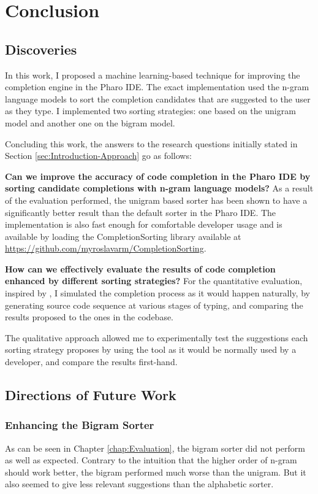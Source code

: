 \chapter{Conclusion}
\label{chap:Conclusion}
\section{Discoveries}
\label{sec:Conclusion-Discoveries}
In this work, I proposed a machine learning-based technique for improving the completion engine in the Pharo IDE. The exact implementation used the n-gram language models to sort the completion candidates that are suggested to the user as they type. I implemented two sorting strategies: one based on the unigram model and another one on the bigram model.

Concluding this work, the answers to the research questions initially stated in Section \ref{sec:Introduction-Approach} go as follows:
\begin{RQ}
    \item \textbf{Can we improve the accuracy of code completion in the Pharo IDE by sorting candidate completions with n-gram language models?} As a result of the evaluation performed, the unigram based sorter has been shown to have a significantly better result than the default sorter in the Pharo IDE. The implementation is also fast enough for comfortable developer usage and is available by loading the CompletionSorting library available at \url{https://github.com/myroslavarm/CompletionSorting}.
    \item \textbf{How can we effectively evaluate the results of code completion enhanced by different sorting strategies?} For the quantitative evaluation, inspired by \cite{Robb08a}, I simulated the completion process as it would happen naturally, by generating source code sequence at various stages of typing, and comparing the results proposed to the ones in the codebase.
    
    The qualitative approach allowed me to experimentally test the suggestions each sorting strategy proposes by using the tool as it would be normally used by a developer, and compare the results first-hand.
\end{RQ}

\section{Directions of Future Work}
\label{sec:Conclusion-FutureWork}
\subsection{Enhancing the Bigram Sorter}
As can be seen in Chapter \ref{chap:Evaluation}, the bigram sorter did not perform as well as expected. Contrary to the intuition that the higher order of n-gram should work better, the bigram performed much worse than the unigram. But it also seemed to give less relevant suggestions than the alphabetic sorter.

